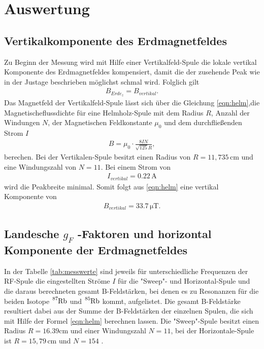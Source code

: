 \section{Auswertung}
\label{sec:Auswertung}
\subsection{Vertikalkomponente des Erdmagnetfeldes}
Zu Beginn der Messung wird mit Hilfe einer Vertikalfeld-Spule
die lokale vertikal Komponente des Erdmagnetfeldes kompensiert, damit
 die der zusehende Peak
wie in der Justage beschrieben möglichst schmal wird. Folglich
gilt
\begin{align*}
B_{Erde_z}=B_{vertikal}.
\end{align*}
Das Magnetfeld der Vertikalfeld-Spule lässt sich über die Gleichung
\eqref{eqn:helm},die Magnetischeflussdichte für eine Helmholz-Spule mit dem Radius $R$,
Anzahl der Windungen $N$, der Magnetischen Feldkonstante $\mu_0$ und dem durchfließenden Strom $I$
\begin{align}
B=\mu_0 \cdot \frac{8 I N}{\sqrt{125} R}, \label{eqn:helm}
\end{align}
berechen. Bei der Vertikalen-Spule besitzt einen Radius von $R=11,735\,\si{\centi\meter} $
und eine Windungszahl von $N=11$.
Bei einem Strom von
\begin{align*}
  I_{vertikal}=0.22 \,\si{\ampere}
\end{align*}
wird die Peakbreite minimal. Somit folgt aus \eqref{eqn:helm}
eine  vertikal Komponente von
\begin{align*}
  B_{vertikal}=33.7\,\si{\micro\tesla}.
\end{align*}



\subsection{Landesche $g_F$ -Faktoren und horizontal Komponente der Erdmagnetfeldes}
In der Tabelle \ref{tab:messwerte} sind jeweils
für  unterschiedliche Frequenzen der RF-Spule
die eingestellten Ströme $I$ für die "Sweep"- und Horizontal-Spule
und die daraus
berechneten gesamt B-Feldstärken,
bei denen es zu Resonanzen für die beiden Isotope $\ce{^{87}Rb}$ und $\ce{^{85}Rb}$
 kommt, aufgelistet.
Die gesamt  B-Feldstärke resultiert dabei aus
der Summe der B-Feldstärken der
einzelnen Spulen, die sich mit Hilfe der Formel \eqref{eqn:helm}
berechnen lassen.
Die "Sweep"-Spule besitzt einen Radius  $R=16.39\si{\centi\meter}$
und einer Windungszahl $N=11$, bei der Horizontale-Spule ist $R=15,79\,\si{\centi\meter}$
 und $N=154$ .

